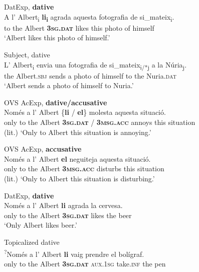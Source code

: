 \documentclass[output=paper,colorlinks,citecolor=brown,modfonts,nonflat]{langsci/langscibook}
\begin{document}
 \ex DatExp, \textbf{dative}\label{ex:royo:8c}\\
 \gll A l’ Albert\textsubscript{i} \textbf{li\textsubscript{i}} agrada aquesta fotografia de si\_mateix\textsubscript{i}.\\
 to the Albert \textbf{\textsc{3sg.dat}} likes this photo of himself\\
\glt ‘Albert likes this photo of himself.’


  \ex Subject, dative\label{ex:royo:8d}\\
 \gll L’ Albert\textsubscript{i} envia una fotografia de si\_mateix\textsubscript{i/*j} a la Núria\textsubscript{j}.\\
 the Albert.\textsc{sbj} sends a photo of himself to the Nuria.\textsc{dat}\\
\glt ‘Albert sends a photo of himself to Nuria.’

 \z
 \z

\ea%
 \label{ex:royo:9}
 \ea OVS AcExp, \textbf{dative/accusative} \label{ex:royo:9a}\\
 \gll Només a l’ Albert \{\textbf{li} / \textbf{el}\} molesta aquesta situació. \\
 only to the Albert \textbf{\textsc{3sg.dat}} / \textbf{\textsc{3msg.acc}} annoys this situation \\
\glt (lit.) ‘Only to Albert this situation is annoying.’

 \ex OVS AcExp, \textbf{accusative} \label{ex:royo:9b}\\
 \gll Només a l’ Albert \textbf{el} neguiteja aquesta situació.\\
 only to the Albert \textbf{\textsc{3msg.acc}} disturbs this situation\\
 \glt (lit.) ‘Only to Albert this situation is disturbing.’

  \ex DatExp, \textbf{dative} \label{ex:royo:9c}\\
 \gll   Només a l’ Albert \textbf{li} agrada la cervesa. \\
 only to the Albert \textbf{\textsc{3sg.dat}} likes the beer\\
\glt ‘Only Albert likes beer.’

 \ex Topicalized dative \label{ex:royo:9d}\\
\gll \textsuperscript{?}Només a l’ Albert \textbf{li} vaig prendre el bolígraf.\footnotemark{}\\
 only to the Albert \textbf{\textsc{3sg.dat}} \textsc{aux.1sg} take.\textsc{inf} the pen\\
\glt
 \z
 \z
\end{document}
